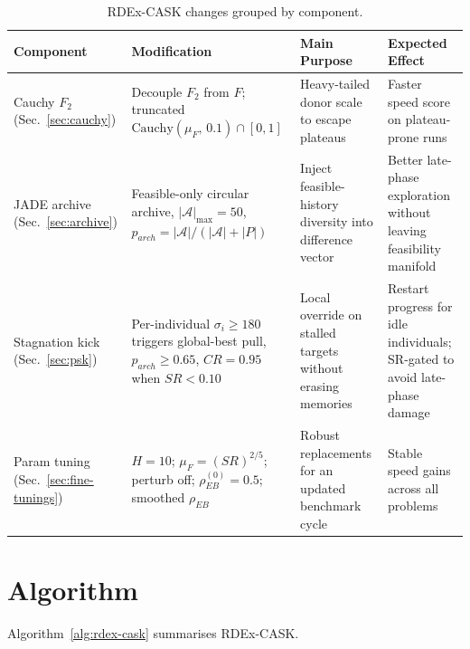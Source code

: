 \documentclass[conference]{IEEEtran}
\begin{document}
\begin{table}[!t]
\centering
\caption{RDEx-CASK changes grouped by component.}
\label{tab:components}
\footnotesize
\setlength{\tabcolsep}{4pt}
\renewcommand{\arraystretch}{1.2}
\begin{tabular}{@{}>{\raggedright\arraybackslash}p{} >{\raggedright\arraybackslash}p{} >{\raggedright\arraybackslash}p{} >{\raggedright\arraybackslash}p{}@{}}
\toprule
Component & Modification & Main Purpose & Expected Effect \\
\midrule
Cauchy $F_2$ (Sec.~\ref{sec:cauchy}) & Decouple $F_2$ from $F$; truncated $\mathrm{Cauchy}(\mu_F,\,0.1)\cap[0,1]$ & Heavy-tailed donor scale to escape plateaus & Faster speed score on plateau-prone runs \\
JADE archive (Sec.~\ref{sec:archive}) & Feasible-only circular archive, $|\mathcal{A}|_{\max}{=}50$, $p_{arch}{=}|\mathcal{A}|/(|\mathcal{A}|{+}|P|)$ & Inject feasible-history diversity into difference vector & Better late-phase exploration without leaving feasibility manifold \\
Stagnation kick (Sec.~\ref{sec:psk}) & Per-individual $\sigma_i \ge 180$ triggers global-best pull, $p_{arch}{\ge}0.65$, $CR{=}0.95$ when $SR{<}0.10$ & Local override on stalled targets without erasing memories & Restart progress for idle individuals; SR-gated to avoid late-phase damage \\
Param tuning (Sec.~\ref{sec:fine-tunings}) & $H{=}10$; $\mu_F{=}(SR)^{2/5}$; perturb off; $\rho_{EB}^{(0)}{=}0.5$; smoothed $\rho_{EB}$ & Robust replacements for an updated benchmark cycle & Stable speed gains across all problems \\
\bottomrule
\end{tabular}
\end{table}

\section{Algorithm}
Algorithm~\ref{alg:rdex-cask} summarises RDEx-CASK.
\end{document}
